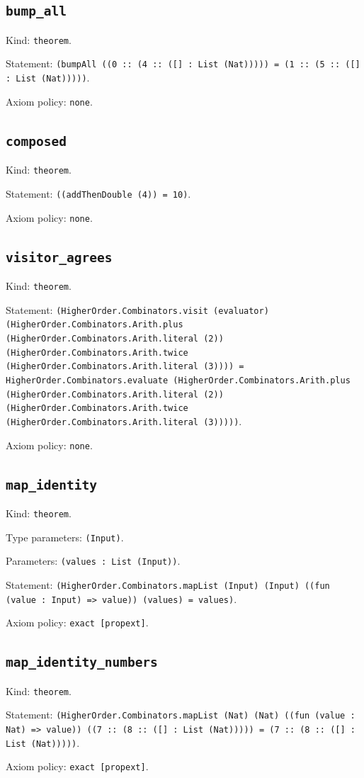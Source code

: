 \documentclass[11pt]{article}
\begin{document}
\subsection*{\texttt{bump\_all}}
\noindent Kind: \texttt{theorem}.\par
\noindent Statement: \texttt{(bumpAll ((0 :: (4 :: ([] : List (Nat))))) = (1 :: (5 :: ([] : List (Nat)))))}.\par
\noindent Axiom policy: \texttt{none}.\par
\subsection*{\texttt{composed}}
\noindent Kind: \texttt{theorem}.\par
\noindent Statement: \texttt{((addThenDouble (4)) = 10)}.\par
\noindent Axiom policy: \texttt{none}.\par
\subsection*{\texttt{visitor\_agrees}}
\noindent Kind: \texttt{theorem}.\par
\noindent Statement: \texttt{(HigherOrder.Combinators.visit (evaluator) (HigherOrder.Combinators.Arith.plus (HigherOrder.Combinators.Arith.literal (2)) (HigherOrder.Combinators.Arith.twice (HigherOrder.Combinators.Arith.literal (3)))) = HigherOrder.Combinators.evaluate (HigherOrder.Combinators.Arith.plus (HigherOrder.Combinators.Arith.literal (2)) (HigherOrder.Combinators.Arith.twice (HigherOrder.Combinators.Arith.literal (3)))))}.\par
\noindent Axiom policy: \texttt{none}.\par
\subsection*{\texttt{map\_identity}}
\noindent Kind: \texttt{theorem}.\par
\noindent Type parameters: \texttt{(Input)}.\par
\noindent Parameters: \texttt{(values : List (Input))}.\par
\noindent Statement: \texttt{(HigherOrder.Combinators.mapList (Input) (Input) ((fun (value : Input) => value)) (values) = values)}.\par
\noindent Axiom policy: \texttt{exact [propext]}.\par
\subsection*{\texttt{map\_identity\_numbers}}
\noindent Kind: \texttt{theorem}.\par
\noindent Statement: \texttt{(HigherOrder.Combinators.mapList (Nat) (Nat) ((fun (value : Nat) => value)) ((7 :: (8 :: ([] : List (Nat))))) = (7 :: (8 :: ([] : List (Nat)))))}.\par
\noindent Axiom policy: \texttt{exact [propext]}.\par
\end{document}
